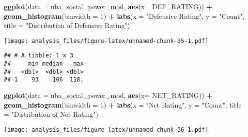 \documentclass[]{article}
\newenvironment{Shaded}{\begin{snugshade}}{\end{snugshade}}
\newcommand{\DataTypeTok}[1]{\textcolor[rgb]{0.13,0.29,0.53}{#1}}
\newcommand{\DecValTok}[1]{\textcolor[rgb]{0.00,0.00,0.81}{#1}}
\newcommand{\KeywordTok}[1]{\textcolor[rgb]{0.13,0.29,0.53}{\textbf{#1}}}
\newcommand{\NormalTok}[1]{#1}
\newcommand{\OperatorTok}[1]{\textcolor[rgb]{0.81,0.36,0.00}{\textbf{#1}}}
\newcommand{\StringTok}[1]{\textcolor[rgb]{0.31,0.60,0.02}{#1}}
\begin{document}
\begin{Shaded}
\begin{Highlighting}[]
\KeywordTok{ggplot}\NormalTok{(}\DataTypeTok{data =}\NormalTok{ nba_social_power_mod, }\KeywordTok{aes}\NormalTok{(}\DataTypeTok{x=}\NormalTok{ DEF_RATING)) }\OperatorTok{+}\StringTok{ }
\StringTok{  }\KeywordTok{geom_histogram}\NormalTok{(}\DataTypeTok{binwidth =} \DecValTok{1}\NormalTok{) }\OperatorTok{+}
\StringTok{  }\KeywordTok{labs}\NormalTok{(}\DataTypeTok{x =} \StringTok{"Defensive Rating"}\NormalTok{, }\DataTypeTok{y =} \StringTok{"Count"}\NormalTok{,}
       \DataTypeTok{title =} \StringTok{"Distribution of Defensive Rating"}\NormalTok{)}
\end{Highlighting}
\end{Shaded}

\texttt{[image: analysis\_files/figure-latex/unnamed-chunk-35-1.pdf]}

\begin{Shaded}
\end{Shaded}

\begin{verbatim}
## # A tibble: 1 x 3
##     min median   max
##   <dbl>  <dbl> <dbl>
## 1    93    106  118.
\end{verbatim}

\begin{Shaded}
\begin{Highlighting}[]
\KeywordTok{ggplot}\NormalTok{(}\DataTypeTok{data =}\NormalTok{ nba_social_power_mod, }\KeywordTok{aes}\NormalTok{(}\DataTypeTok{x=}\NormalTok{ NET_RATING)) }\OperatorTok{+}\StringTok{ }
\StringTok{  }\KeywordTok{geom_histogram}\NormalTok{(}\DataTypeTok{binwidth =} \DecValTok{1}\NormalTok{) }\OperatorTok{+}
\StringTok{  }\KeywordTok{labs}\NormalTok{(}\DataTypeTok{x =} \StringTok{"Net Rating"}\NormalTok{, }\DataTypeTok{y =} \StringTok{"Count"}\NormalTok{,}
       \DataTypeTok{title =} \StringTok{"Distribution of Net Rating"}\NormalTok{)}
\end{Highlighting}
\end{Shaded}

\texttt{[image: analysis\_files/figure-latex/unnamed-chunk-36-1.pdf]}
\end{document}
